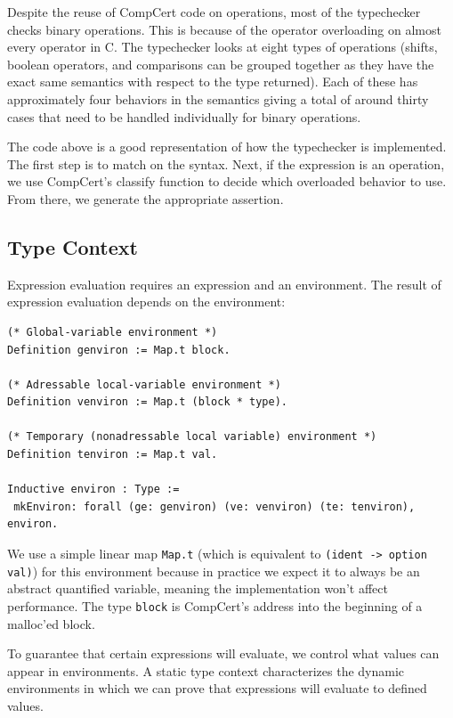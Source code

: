 \documentclass{puthesis}
\begin{document}
Despite the reuse of CompCert code on operations, most of the
typechecker checks binary operations. This is because of the operator
overloading on almost every operator in C. The typechecker looks at
eight types of operations (shifts, boolean operators, and comparisons
can be grouped together as they have the exact same semantics with
respect to the type returned). Each of these has approximately four
behaviors in the semantics giving a total of around thirty cases that
need to be handled individually for binary operations.
 
The code above is a good representation of how the typechecker is
implemented. The first step is to match on the syntax. Next, if the expression
is an operation, we use CompCert's classify function to decide which overloaded
behavior to use. From there, we generate the appropriate assertion. 

\subsection{Type Context}
\label{sec:context}

Expression evaluation requires an expression and an environment.  The
result of expression evaluation depends on the environment:

\begin{lstlisting}
(* Global-variable environment *)
Definition genviron := Map.t block.

(* Adressable local-variable environment *)
Definition venviron := Map.t (block * type).

(* Temporary (nonadressable local variable) environment *)
Definition tenviron := Map.t val.

Inductive environ : Type :=
 mkEnviron: forall (ge: genviron) (ve: venviron) (te: tenviron), environ.
\end{lstlisting}

We use a simple linear map \lstinline|Map.t| (which is equivalent to
\lstinline|(ident -> option val)|) for this environment because in
practice we expect it to always be an abstract quantified variable,
meaning the implementation won't affect performance. The type
\lstinline|block| is CompCert's address into the beginning of a
malloc'ed block.

To guarantee that certain expressions will evaluate, we control what
values can appear in environments. A static type context characterizes
the dynamic environments in which we can prove that expressions will
evaluate to defined values.
\end{document}
